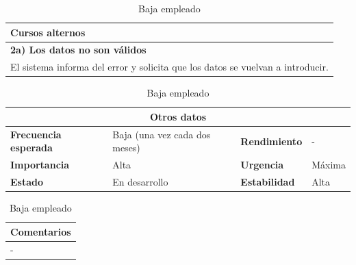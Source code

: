 \documentclass[12pt,spanish]{article}
\begin{document}
\begin{table}[H]
\vspace{1cm}

\begin{tabular}{|m{10pt}|m{7.15cm}|m{10pt}|m{7.15cm}|}
\hline
\multicolumn{4}{|m{16.2cm}|}{\textbf{Cursos alternos}} \\
\hline
\multicolumn{4}{|m{16.2cm}|}{\textbf{2a) Los datos no son válidos}} \\
\hline
\multicolumn{4}{|m{16.2cm}|}{El sistema informa del error y solicita que los datos se vuelvan a introducir.} \\
\hline
\end{tabular}

\vspace{1cm}

\begin{tabular}{|m{3.72cm}|m{3.72cm}|m{3.72cm}|m{3.72cm}|}
\hline
\multicolumn{4}{|c|}{\textbf{Otros datos}} \\
\hline
\textbf{Frecuencia esperada} & Baja (una vez cada dos meses) & \textbf{Rendimiento} & - \\
\hline
\textbf{Importancia} & Alta & \textbf{Urgencia} & Máxima \\
\hline
\textbf{Estado} & En desarrollo & \textbf{Estabilidad} & Alta \\
\hline
\end{tabular}

\vspace{1cm}

\begin{tabular}{|m{16.2cm}|}
\hline
\textbf{Comentarios} \\
\hline
- \\
\hline
\end{tabular}

\caption{Baja empleado}

\end{table}
\end{document}
